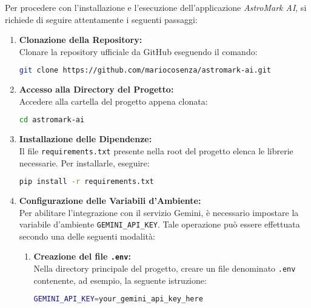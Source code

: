 Per procedere con l'installazione e l'esecuzione dell'applicazione \textit{AstroMark AI}, si richiede di seguire attentamente i seguenti passaggi:

\begin{enumerate}
    \item \textbf{Clonazione della Repository:} \\
    Clonare la repository ufficiale da GitHub eseguendo il comando:
    \begin{lstlisting}[language=bash, caption=Clonazione della repository]
git clone https://github.com/mariocosenza/astromark-ai.git
    \end{lstlisting}

    \item \textbf{Accesso alla Directory del Progetto:} \\
    Accedere alla cartella del progetto appena clonata:
    \begin{lstlisting}[language=bash, caption=Accesso alla directory del progetto]
cd astromark-ai
    \end{lstlisting}

    \item \textbf{Installazione delle Dipendenze:} \\
    Il file \texttt{requirements.txt} presente nella root del progetto elenca le librerie necessarie. Per installarle, eseguire:
    \begin{lstlisting}[language=bash, caption=Installazione delle dipendenze]
pip install -r requirements.txt
    \end{lstlisting}

    \item \textbf{Configurazione delle Variabili d'Ambiente:} \\
    Per abilitare l'integrazione con il servizio Gemini, è necessario impostare la variabile d'ambiente \texttt{GEMINI\_API\_KEY}. Tale operazione può essere effettuata secondo una delle seguenti modalità:

    \begin{enumerate}[label=\alph*)]
        \item \textbf{Creazione del file \texttt{.env}:} \\
        Nella directory principale del progetto, creare un file denominato \texttt{.env} contenente, ad esempio, la seguente istruzione:
        \begin{lstlisting}[language=bash, caption=Esempio di configurazione nel file .env]
GEMINI_API_KEY=your_gemini_api_key_here
        \end{lstlisting}


\end{enumerate}
\end{enumerate}
